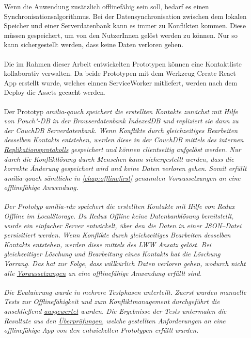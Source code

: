 Wenn die Anwendung zusätzlich offlinefähig sein soll, bedarf es einen Synchronisationsalgorithmus.
Bei der Datensynchronisation zwischen dem lokalen Speicher und einer Serverdatenbank kann es immer zu Konflikten kommen.
Diese müssen gespeichert, um von den NutzerInnen gelöst werden zu können. Nur so kann sichergestellt werden, dass keine Daten verloren gehen.\\\\
%
%
%
Die im Rahmen dieser Arbeit entwickelten Prototypen können eine Kontaktliste kollaborativ verwalten.
Da beide Prototypen mit dem Werkzeug Create React App erstellt wurde, welches einnen ServiceWorker mitliefert, werden nach dem Deploy die \gls{Assets} gecacht werden.\\\\
Der Prototyp \it{amilia-qouch} speichert die erstellten Kontakte zunächst mit Hilfe von Pouch"-DB in der Browserdatenbank IndexedDB und repliziert sie dann zu der CouchDB Serverdatenbank.
Wenn Konflikte durch gleichzeitiges Bearbeiten desselben Kontakts entstehen, werden diese in der CouchDB mittels des internen \hyperref[chap:replication]{Replikationsprotokolls} gespeichert und können clientseitig aufgelöst werden.
Nur durch die Konfliktlösung durch Menschen kann sichergestellt werden, dass die korrekte Änderung gespeichert wird und keine Daten verloren gehen.
Somit erfüllt \it{amilia-qouch} sämtliche in \autoref{chap:offlinefirst} genannten Voraussetzungen an eine offlinefähige Anwendung.\\\\
%
Der Prototyp \it{amilia-rdx} speichert die erstellten Kontakte mit Hilfe von Redux Offline im LocalStorage.
Da Redux Offline keine Datenbanklösung bereitstellt, wurde ein einfacher Server entwickelt, über den die Daten in einer \gls{JSON}--Datei persisitiert werden.
Wenn Konflikte durch gleichzeitiges Bearbeiten desselben Kontakts entstehen, werden diese mittels des \gls{LWW} Ansatz gelöst.
Bei gleichzeitiger Löschung und Bearbeitung eines Kontakts hat die Löschung Vorrang.
Das hat zur Folge, dass willkürlich Daten verloren gehen, wodurch nicht alle \hyperref[chap:offlinefirst]{Voraussetzungen} an eine offlinefähige Anwendung erfüllt sind.\\\\
%
%
Die Evaluierung wurde in mehrere Testphasen unterteilt. Zuerst wurden manuelle Tests zur Offlinefähigkeit und zum Konfliktmanagement durchgeführt die anschließend \hyperref[chap:testauswertung]{ausgewertet} wurden. Die Ergebnisse der Tests untermalen die Resultate aus den \hyperref[chap:auswertunganforderungen]{Überprüfungen}, welche gestellten Anforderungen an eine offlinefähige \gls{App} von den entwickelten Prototypen erfüllt wurden.
